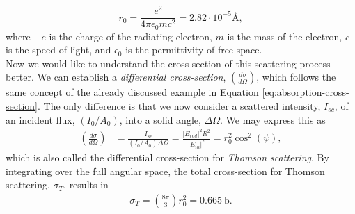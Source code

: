 \begin{equation}
r_0 = \frac{e^2}{4\pi \epsilon_0 m c^2} = 2.82\cdot 10^{-5}\si{\angstrom},
\label{eq:thomson-scattering-length}
\end{equation}
where $-e$ is the charge of the radiating electron, $m$ is the mass of the electron, $c$ is the speed of light, and $\epsilon_0$ is the permittivity of free space.\\[1\baselineskip]
%
Now we would like to understand the cross-section of this scattering process better. We can establish a \textit{differential cross-section}, $\left(\tfrac{d\sigma}{d\Omega}\right)$, which follows the same concept of the already discussed example in Equation \eqref{eq:absorption-cross-section}. The only difference is that we now consider a scattered intensity, $I_{sc}$, of an incident flux, $\left(I_{0}/A_{0}\right)$, into a solid angle, $\Delta \Omega$. We may express this as
\begin{align}
\left(\frac{d\sigma}{d\Omega}\right)&=\frac{I_{sc}}{\left(I_{0}/A_{0}\right)\Delta\Omega}=\frac{\lvert E_{rad}\rvert^2 R^2}{\lvert E_{in}\rvert^2}=r_0^2 \cos^{2}\left(\psi\right),
\label{eq:scattering-crosssection}
\end{align}
which is also called the differential cross-section for \textit{Thomson scattering}. By integrating over the full angular space, the total cross-section for Thomson scattering, $\sigma_{T}$, results in
\begin{align}
\sigma_{T} = \left(\frac{8\pi}{3}\right) r_{0}^{2} = \SI{0.665}{\barn}.
\label{eq:Thomson-cross-section}
\end{align}
